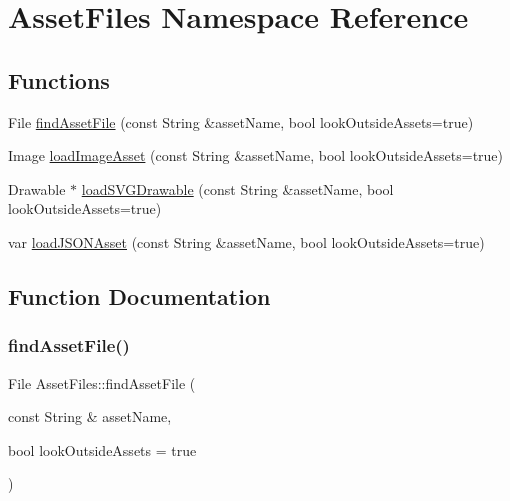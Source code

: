 \hypertarget{namespaceAssetFiles}{}\section{Asset\+Files Namespace Reference}
\label{namespaceAssetFiles}
\subsection*{Functions}
\begin{DoxyCompactItemize}
\item 
File \mbox{\hyperlink{namespaceAssetFiles_a5c8bcc68293ec4b5200ada870dc32398}{find\+Asset\+File}} (const String \&asset\+Name, bool look\+Outside\+Assets=true)
\item 
Image \mbox{\hyperlink{namespaceAssetFiles_a40e7c07e1d4cbdeb097b7f4350af0050}{load\+Image\+Asset}} (const String \&asset\+Name, bool look\+Outside\+Assets=true)
\item 
Drawable $\ast$ \mbox{\hyperlink{namespaceAssetFiles_a8975b48c898f7f632c8a617543c21690}{load\+S\+V\+G\+Drawable}} (const String \&asset\+Name, bool look\+Outside\+Assets=true)
\item 
var \mbox{\hyperlink{namespaceAssetFiles_a2dafaffb7079b9b899753e8dc5b4b0df}{load\+J\+S\+O\+N\+Asset}} (const String \&asset\+Name, bool look\+Outside\+Assets=true)
\end{DoxyCompactItemize}


\subsection{Function Documentation}
\mbox{\label{namespaceAssetFiles_a5c8bcc68293ec4b5200ada870dc32398}} 
\subsubsection{\texorpdfstring{find\+Asset\+File()}{findAssetFile()}}
{\footnotesize\ttfamily File Asset\+Files\+::find\+Asset\+File (\begin{DoxyParamCaption}\item[{const String \&}]{asset\+Name,  }\item[{bool}]{look\+Outside\+Assets = {\ttfamily true} }\end{DoxyParamCaption})}


